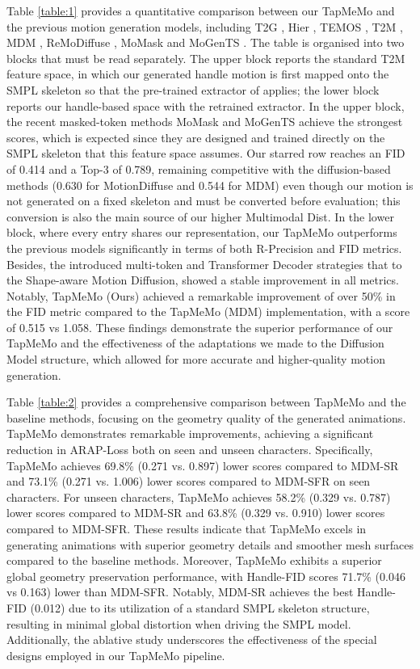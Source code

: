 \documentclass[lettersize,journal]{IEEEtran}
\newcommand{\blu}[1]{\texorpdfstring{{\leavevmode\color{blue}#1}}{#1}}
\begin{document}
Table \ref{table:1} provides a quantitative comparison between our TapMeMo and the previous
motion generation models, including T2G \cite{bhattacharya2021text2gestures}, Hier
\cite{ghosh2021synthesis}, TEMOS \cite{petrovich2022temos}, T2M \cite{guo2022generating},
MDM \cite{tevet2022human}, \blu{ReMoDiffuse \cite{zhang2023remodiffuse}, MoMask
\cite{guo2024momask} and MoGenTS \cite{yuan2024mogents}. The table is organised into two blocks that must
be read separately. The upper block reports the standard T2M feature space, in which our
generated handle motion is first mapped onto the SMPL skeleton so that the pre-trained
extractor of \cite{guo2022generating} applies; the lower block reports our handle-based
space with the retrained extractor. In the upper block, the recent masked-token methods
MoMask and MoGenTS achieve the strongest scores, which is expected since they are designed
and trained directly on the SMPL skeleton that this feature space assumes. Our starred row
reaches an FID of 0.414 and a Top-3 of 0.789, remaining competitive with the diffusion-based
methods (0.630 for MotionDiffuse and 0.544 for MDM) even though our motion is not generated
on a fixed skeleton and must be converted before evaluation; this conversion is also the
main source of our higher Multimodal Dist. In the lower block, where every entry shares our
representation, our} TapMeMo outperforms the previous models significantly in terms of both
R-Precision and FID metrics. Besides, the introduced multi-token and Transformer Decoder
strategies that to the Shape-aware Motion Diffusion, showed a stable improvement in all
metrics. Notably, TapMeMo (Ours) achieved a remarkable improvement of over 50\% in the FID
metric compared to the TapMeMo (MDM) implementation, with a score of 0.515 vs 1.058. These
findings demonstrate the superior performance of our TapMeMo and the effectiveness of the
adaptations we made to the Diffusion Model structure, which allowed for more accurate and
higher-quality motion generation.

Table \ref{table:2} provides a comprehensive comparison between TapMeMo and the baseline methods, focusing on the geometry quality of the generated animations. TapMeMo demonstrates remarkable improvements, achieving a significant reduction in ARAP-Loss both on seen and unseen characters. Specifically, TapMeMo achieves 69.8\% (0.271 vs. 0.897) lower scores compared to MDM-SR and 73.1\% (0.271 vs. 1.006) lower scores compared to MDM-SFR on seen characters. For unseen characters, TapMeMo achieves 58.2\% (0.329 vs. 0.787) lower scores compared to MDM-SR and 63.8\% (0.329 vs. 0.910) lower scores compared to MDM-SFR. These results indicate that TapMeMo excels in generating animations with superior geometry details and smoother mesh surfaces compared to the baseline methods. Moreover, TapMeMo exhibits a superior global geometry preservation performance, with Handle-FID scores 71.7\% (0.046 vs 0.163) lower than MDM-SFR. Notably, MDM-SR achieves the best Handle-FID (0.012) due to its utilization of a standard SMPL skeleton structure, resulting in minimal global distortion when driving the SMPL model. Additionally, the ablative study underscores the effectiveness of the special designs employed in our TapMeMo pipeline.
\end{document}
